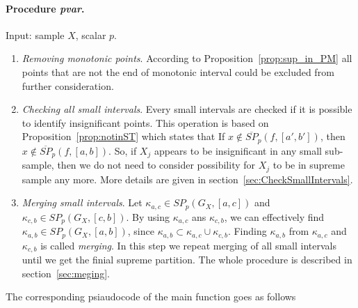 \documentclass[12pt, a4paper]{article}
\numberwithin{equation}{section}
\begin{document}
\paragraph{Procedure \emph{pvar}.}
Input: sample $X$, scalar $p$.

\begin{enumerate}
  \item \emph{Removing monotonic points}. According to 
  Proposition~\ref{prop:sup_in_PM}
  all points that are not the end of 
  monotonic interval could be excluded 
  from further consideration. 
  
  \item \emph{Checking all small intervals}. Every small intervals are
    checked if it is possible to 
    identify insignificant points. 
    This operation is based on 
    Proposition~\ref{prop:notinST} which states that 
    If $x \notin \overline{SP}_p(f, [a', b'])$, then 
    $x \notin \overline{SP}_p(f, [a, b])$.
    So, if $X_j$ appears to be insignificant in
    any small sub-sample, then
    we do not need to consider possibility for
    $X_j$ to be in supreme sample any more. 
    More details are given in section~\ref{sec:CheckSmallIntervals}.  
 
  \item \emph{Merging small intervals}.  
   Let $\kappa_{a,c} \in SP_p(G_X, [a,c])$ and
   $\kappa_{c,b} \in SP_p(G_X, [c, b])$. By using $\kappa_{a,c}$
   ans $\kappa_{c,b}$, we can effectively
   find $\kappa_{a,b} \in SP_p(G_X, [a, b])$, since
   $\kappa_{a,b} \subset \kappa_{a,c} \cup \kappa_{c,b}$. 
   Finding
   $\kappa_{a,b}$ from $\kappa_{a,c}$ and $\kappa_{c,b}$ 
   is called \emph{merging}.
   In this step we repeat merging of all small intervals until
   we get the finial supreme partition.
   The whole procedure is described in section~\ref{sec:meging}.  
  
\end{enumerate}



The corresponding psiaudocode of the main function goes as follows
\end{document}
